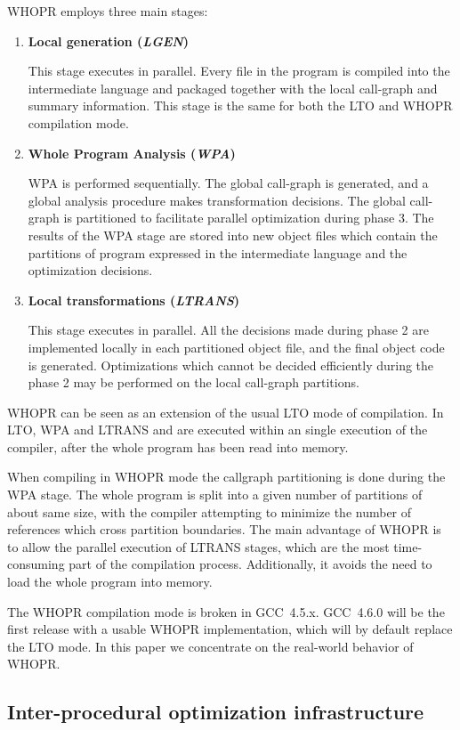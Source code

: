 \documentclass[final]{ols}
\begin{document}
WHOPR employs three main stages:
\begin{enumerate}
\item {\bf Local generation ({\em LGEN})}

This stage executes in parallel. Every file in the program is compiled into the
intermediate language and packaged together with the local call-graph and summary
information.  This stage is the same for both the LTO and WHOPR compilation mode.
\item {\bf Whole Program Analysis ({\em WPA})}


WPA is performed sequentially. The global call-graph is generated, and a
global analysis procedure makes transformation decisions. The global call-graph
is partitioned to facilitate parallel optimization during phase 3. The results of the
WPA stage are stored into new object files which contain the partitions of program
expressed in the intermediate language and the optimization decisions.
\item {\bf Local transformations ({\em LTRANS})}


This stage executes in parallel. All the decisions made during phase 2 are
implemented locally in each partitioned object file, and the final object code is generated.
Optimizations which cannot be decided efficiently during the phase 2 may be
performed on the local call-graph partitions.
\end{enumerate}
WHOPR can be seen as an extension of the usual LTO mode of compilation. In LTO,
WPA and LTRANS and are executed within an single execution of the
compiler, after the whole program has been read into  memory.

When compiling in WHOPR mode the callgraph partitioning is done during the WPA
stage.  The whole program is split into a given number of partitions of about
same size, with the compiler attempting to minimize the number of references
which cross partition boundaries.  The main advantage of WHOPR is to allow the
parallel execution of LTRANS stages, which are the most time-consuming part of
the compilation process. Additionally, it avoids the need to load the whole
program into memory.

The WHOPR compilation mode is broken in GCC~4.5.x.  GCC~4.6.0 will be the first
release with a usable WHOPR implementation, which will by default replace the
LTO mode.  In this paper we concentrate on the real-world behavior of WHOPR.

\subsection{Inter-procedural optimization infrastructure}
\label{ipapass}
\end{document}
